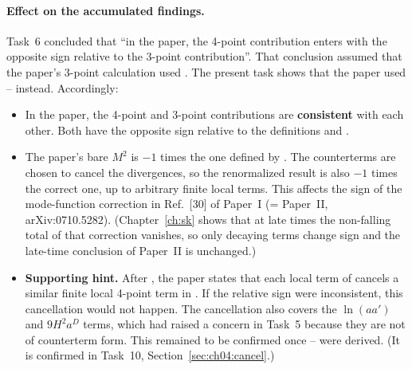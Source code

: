 \paragraph{Effect on the accumulated findings.}
Task~6 concluded that ``in the paper, the 4-point contribution enters with the opposite sign relative to the 3-point contribution''.
That conclusion assumed that the paper's 3-point calculation used .
The present task shows that the paper used -- instead. Accordingly:
\begin{itemize}[leftmargin=1.2em,itemsep=2pt]
\item In the paper, the 4-point and 3-point contributions are \textbf{consistent} with each other.
Both have the opposite sign relative to the definitions  and .
\item The paper's bare $M^2$ is $-1$ times the one defined by .
The counterterms are chosen to cancel the divergences, so the renormalized result is also $-1$ times the correct one, up to arbitrary finite local terms.
This affects the sign of the mode-function correction in Ref.~[30] of Paper~I (= Paper~II, arXiv:0710.5282).
(Chapter~\ref{ch:sk} shows that at late times the non-falling total of that correction vanishes, so only decaying terms change sign and the late-time conclusion of Paper~II is unchanged.)
\item \textbf{Supporting hint.} After , the paper states that each local term of  cancels a similar finite local 4-point term in .
If the relative sign were inconsistent, this cancellation would not happen.
The cancellation also covers the $\ln(aa')$ and $9H^2a^D$ terms, which had raised a concern in Task~5 because they are not of counterterm form.
This remained to be confirmed once -- were derived.
(It is confirmed in Task~10, Section~\ref{sec:ch04:cancel}.)
\end{itemize}

